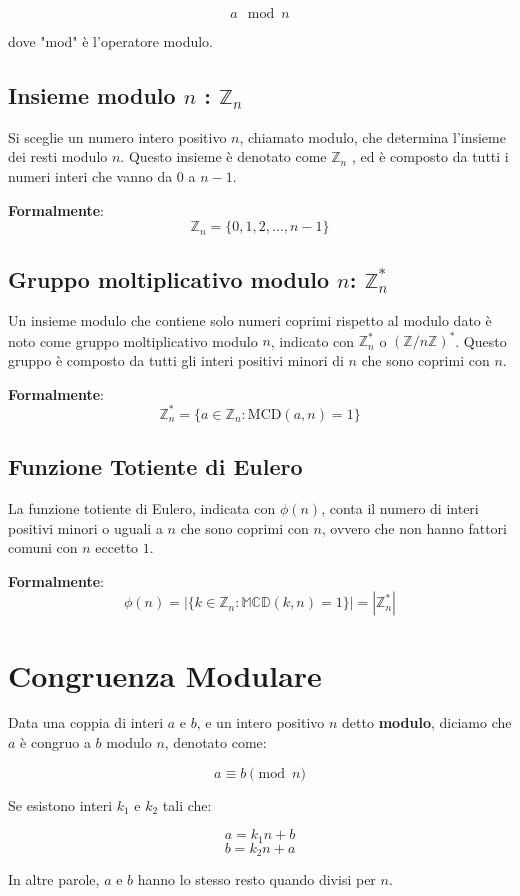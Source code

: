 \documentclass[a4paper,12pt]{report}
\begin{document}
\[ a \mod n \]

dove "mod" è l'operatore modulo.

\subsection*{Insieme modulo \(n\) : \(\mathbb{Z}_n\)}
Si sceglie un numero intero positivo \(n\), chiamato modulo, che determina l'insieme dei resti modulo \(n\). 
Questo insieme è denotato come \(\mathbb{Z}_n\)  , ed è composto da tutti i numeri interi che vanno da 0 a \(n-1\).

\textbf{Formalmente}: \[\mathbb{Z}_n = \{0, 1, 2, \ldots, n-1\}\]

\subsection*{Gruppo moltiplicativo modulo \(n\): \(\mathbb{Z}_n^*\)}
Un insieme modulo che contiene solo numeri coprimi rispetto al modulo dato è noto come gruppo moltiplicativo modulo \(n\), indicato con \(\mathbb{Z}_n^*\) o \((\mathbb{Z}/n\mathbb{Z})^*\). 
Questo gruppo è composto da tutti gli interi positivi minori di \(n\) che sono coprimi con \(n\).

\textbf{Formalmente}: \[\mathbb{Z}_n^* = \{a \in \mathbb{Z}_n : \text{MCD}(a, n) = 1\}\]

\subsection*{Funzione Totiente di Eulero}
La funzione totiente di Eulero, indicata con $\phi(n)$, conta il numero di interi positivi minori o uguali a $n$ che sono coprimi con $n$, ovvero che non hanno fattori comuni con $n$ eccetto $1$. 

\textbf{Formalmente}:\[\phi(n) = |\{k \in \mathbb{Z}_n : \mathbb{MCD}(k, n) = 1\}| = |\mathbb{Z}_n^*|\]
\section{Congruenza Modulare}

Data una coppia di interi $a$ e $b$, e un intero positivo $n$ detto \textbf{modulo}, diciamo che $a$ è congruo a $b$ modulo $n$, denotato come:

$$a \equiv b \pmod{n}$$

Se esistono interi $k_1$ e $k_2$ tali che:

$$a = k_1n + b$$
$$b = k_2n + a$$

In altre parole, $a$ e $b$ hanno lo stesso resto quando divisi per $n$. 
\end{document}
